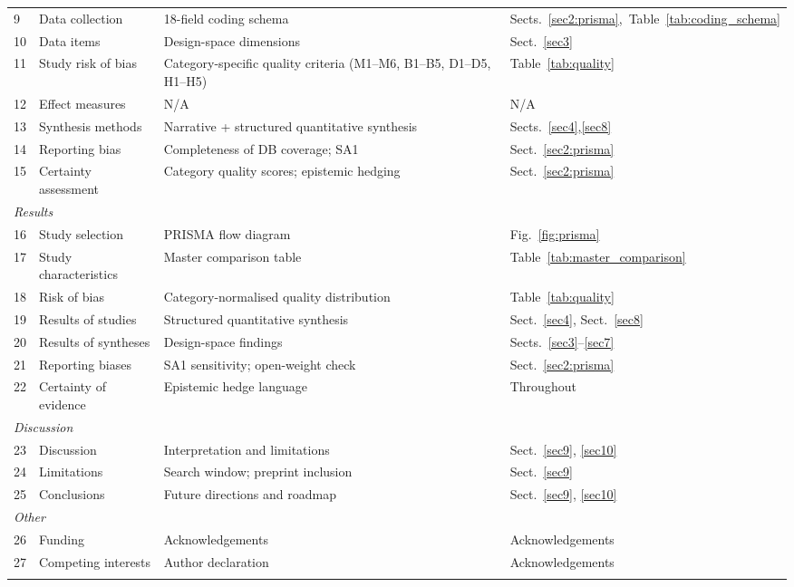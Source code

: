 \begin{table}[h]
\begin{tabular*}{\textwidth}{@{\extracolsep\fill}p{0.5cm}p{3.2cm}p{6.0cm}p{2.0cm}}
9  & Data collection & 18-field coding schema & Sects.~\ref{sec2:prisma},~Table~\ref{tab:coding_schema} \\
10 & Data items & Design-space dimensions & Sect.~\ref{sec3} \\
11 & Study risk of bias & Category-specific quality criteria (M1--M6, B1--B5, D1--D5, H1--H5) & Table~\ref{tab:quality} \\
12 & Effect measures & N/A & N/A \\
13 & Synthesis methods & Narrative + structured quantitative synthesis & Sects.~\ref{sec4},\ref{sec8} \\
14 & Reporting bias & Completeness of DB coverage; SA1 & Sect.~\ref{sec2:prisma} \\
15 & Certainty assessment & Category quality scores; epistemic hedging & Sect.~\ref{sec2:prisma} \\
\midrule
\multicolumn{4}{l}{\textit{Results}} \\
16 & Study selection & PRISMA flow diagram & Fig.~\ref{fig:prisma} \\
17 & Study characteristics & Master comparison table & Table~\ref{tab:master_comparison} \\
18 & Risk of bias & Category-normalised quality distribution & Table~\ref{tab:quality} \\
19 & Results of studies & Structured quantitative synthesis & Sect.~\ref{sec4}, Sect.~\ref{sec8} \\
20 & Results of syntheses & Design-space findings & Sects.~\ref{sec3}--\ref{sec7} \\
21 & Reporting biases & SA1 sensitivity; open-weight check & Sect.~\ref{sec2:prisma} \\
22 & Certainty of evidence & Epistemic hedge language & Throughout \\
\midrule
\multicolumn{4}{l}{\textit{Discussion}} \\
23 & Discussion & Interpretation and limitations & Sect.~\ref{sec9}, \ref{sec10} \\
24 & Limitations & Search window; preprint inclusion & Sect.~\ref{sec9} \\
25 & Conclusions & Future directions and roadmap & Sect.~\ref{sec9}, \ref{sec10} \\
\midrule
\multicolumn{4}{l}{\textit{Other}} \\
26 & Funding & Acknowledgements & Acknowledgements \\
27 & Competing interests & Author declaration & Acknowledgements \\
\botrule
\end{tabular*}
\end{table}

